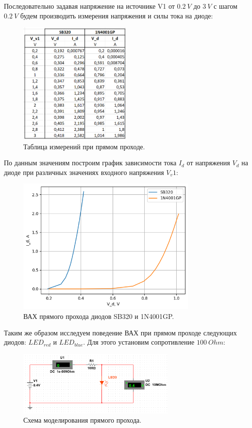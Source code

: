 \documentclass[12pt]{article}
\begin{document}
Последовательно задавая напряжение на источнике V1 от $0.2 \ V$ до $3 \ V$ с шагом $0.2 \ V$ будем производить измерения напряжения и силы тока на диоде:
\begin{figure}[H]
    \centering
    \includegraphics[width=0.5\textwidth]{table_dir_1_2.png}
    \caption{Таблица измерений при прямом проходе.}
    \label{fig:table_dir_1_2}
\end{figure}

По данным значениям построим график зависимости тока $I_d$ от напряжения $V_d$ на диоде при различных значениях входного напряжения $V_v1$:
\begin{figure}[H]
    \centering
    \includegraphics[width=0.8\textwidth]{vac_1_2_dir.png}
    \caption{ВАХ прямого прохода диодов SB320 и 1N4001GP.}
    \label{fig:vac_1_2_dir}
\end{figure}

Таким же образом исследуем поведение ВАХ при прямом проходе следующих диодов: $LED_{red}$ и $LED_{blue}$. Для этого установим сопротивление $100 \ Ohm$:
\begin{figure}[H]
    \centering
    \includegraphics[width=0.7\textwidth]{dir_scheme_b_r.png}
    \caption{Схема моделирования прямого прохода.}
    \label{fig:dir_scheme_b_r}
\end{figure}
\end{document}

